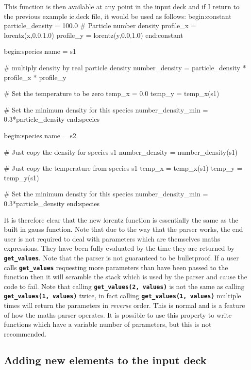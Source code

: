 \documentclass[12pt,a4paper]{article}
\newcommand{\inlinecode}[1]{{\color{warwickred} \bf\texttt{#1}}}
\newenvironment{boxverbatim}{\lboxverbatim{none}}{\endlboxverbatim}
\begin{document}
This function is then available at any point in the input deck and if I return
to the previous example ic.deck file, it would be used as follows:
\begin{boxverbatim}
begin:constant
   particle_density = 100.0 # Particle number density
   profile_x = lorentz(x,0.0,1.0)
   profile_y = lorentz(y,0.0,1.0)
end:constant

begin:species
   name = s1

   # multiply density by real particle density
   number_density = particle_density * profile_x * profile_y

   # Set the temperature to be zero
   temp_x = 0.0
   temp_y = temp_x(s1)

   # Set the minimum density for this species
   number_density_min = 0.3*particle_density
end:species

begin:species
   name = s2

   # Just copy the density for species s1
   number_density = number_density(s1)

   # Just copy the temperature from species s1
   temp_x = temp_x(s1)
   temp_y = temp_y(s1)

   # Set the minimum density for this species
   number_density_min = 0.3*particle_density
end:species
\end{boxverbatim}

It is therefore clear that the new lorentz function is essentially the same as
the built in gauss function. Note that due to the way that the parser works,
the end user is not required to deal with parameters which are themselves
maths expressions. They have been fully evaluated by the time they are
returned by \inlinecode{get\_values}. Note that the parser is not guaranteed to
be bulletproof. If a user calls \inlinecode{get\_values} requesting more
parameters than have been passed to the function then it will scramble the
stack which is used by the parser and cause the code to fail. Note that
calling \inlinecode{get\_values(2, values)} is not the same as calling
\inlinecode{get\_values(1, values)} twice, in fact calling
\inlinecode{get\_values(1, values)} multiple times will return the parameters in
{\it reverse} order. This is normal and is a feature of how the maths parser
operates. It is possible to use this property to write functions which have a
variable number of parameters, but this is not recommended.

\subsection{Adding new elements to the input deck}
\end{document}
